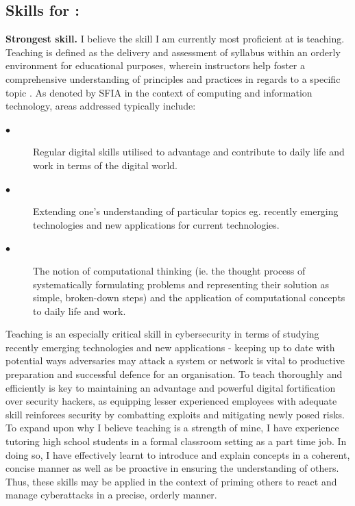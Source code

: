 \documentclass[a4paper, 11pt]{report}
\begin{document}
\subsection{Skills for \majD: \studD}

\textbf{Strongest skill.} 
\newline I believe the skill I am currently most proficient at is teaching. Teaching is defined as the delivery and assessment of syllabus within an orderly environment for educational purposes, wherein instructors help foster a comprehensive understanding of principles and practices in regards to a specific topic \cite{sfia}. As denoted by SFIA \cite{sfia} in the context of computing and information technology, areas addressed typically include: 
\begin{description}
\item[$\bullet$] Regular digital skills utilised to advantage and contribute to daily life and work in terms of the digital world.
\item[$\bullet$]  Extending one’s understanding of particular topics eg. recently emerging technologies and new applications for current technologies.
\item[$\bullet$]  The notion of computational thinking (ie. the thought process of systematically formulating problems and representing their solution as simple, broken-down steps) and the application of computational concepts to daily life and work.
\end{description}

Teaching is an especially critical skill in cybersecurity in terms of studying recently emerging technologies and new applications - keeping up to date with potential ways adversaries may attack a system or network is vital to productive preparation and successful defence for an organisation. To teach thoroughly and efficiently is key to maintaining an advantage and powerful digital fortification over security hackers, as equipping lesser experienced employees with adequate skill reinforces security by combatting exploits and mitigating newly posed risks. To expand upon why I believe teaching is a strength of mine, I have experience tutoring high school students in a formal classroom setting as a part time job. In doing so, I have effectively learnt to introduce and explain concepts in a coherent, concise manner as well as be proactive in ensuring the understanding of others. Thus, these skills may be applied in the context of priming others to react and manage cyberattacks in a precise, orderly manner. 
\end{document}
